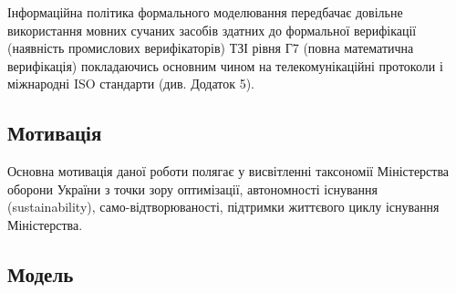 Інформаційна політика формального моделювання передбачає довільне
використання мовних сучаних засобів здатних до формальної верифікації (наявність
промислових верифікаторів) ТЗІ рівня Г7 (повна математична верифікація)
покладаючись основним чином на телекомунікаційні протоколи і міжнародні
ISO стандарти (див. Додаток 5).

\subsection{Мотивація}

Основна мотивація даної роботи полягає у висвітленні таксономії
Міністерства оборони України з точки зору оптимізації, автономності
існування (sustainability), само-відтворюваності, підтримки життєвого
циклу існування Міністерства.

\subsection{Модель}

